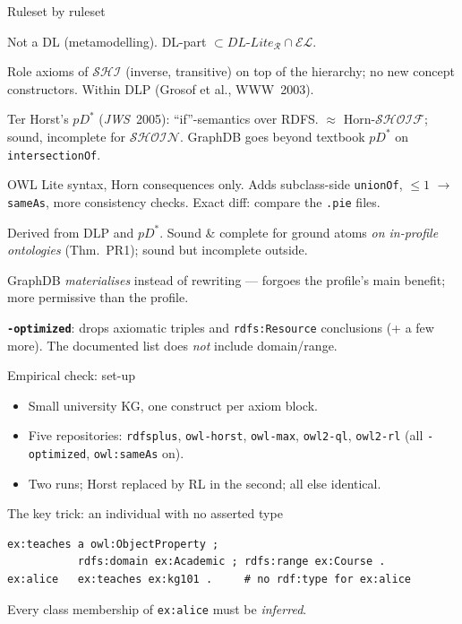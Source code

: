 \documentclass[10pt,aspectratio=169,xcolor=table]{beamer}
\newcommand{\dl}[1]{\ensuremath{\mathcal{#1}}}
\newcommand{\EL}{\dl{EL}}
\newcommand{\SHOIN}{\dl{SHOIN}}
\newcommand{\dllite}[1]{\ensuremath{\textit{DL-Lite}_{#1}}}
\begin{document}
\begin{frame}{Ruleset by ruleset}
  \small
  \begin{description}
    \item[RDFS] Not a DL (metamodelling). DL-part $\subset \dllite{\mathcal{R}} \cap \EL$.
    \item[RDFS-Plus] Role axioms of \dl{SHI} (inverse, transitive) on top of the
      hierarchy; no new concept constructors. Within DLP (Grosof et al., WWW~2003).
    \item[OWL-Horst] Ter Horst's $pD^*$ (\emph{JWS}~2005): ``if''-semantics over RDFS.
      $\approx$ Horn-\dl{SHOIF}; sound, incomplete for \SHOIN. GraphDB goes beyond textbook
      $pD^*$ on \texttt{intersectionOf}.
    \item[OWL-Max] OWL Lite syntax, Horn consequences only. Adds subclass-side
      \texttt{unionOf}, ${\leq}1$ $\to$ \texttt{sameAs}, more consistency checks.
      Exact diff: compare the \texttt{.pie} files.
    \item[OWL 2 RL] Derived from DLP and $pD^*$. Sound \& complete for ground atoms
      \emph{on in-profile ontologies} (Thm.~PR1); sound but incomplete outside.
    \item[OWL 2 QL] GraphDB \emph{materialises} instead of rewriting --- forgoes the
      profile's main benefit; more permissive than the profile.
  \end{description}
  \vspace{2pt}
  \footnotesize\textbf{\texttt{-optimized}}: drops axiomatic triples and \texttt{rdfs:Resource}
  conclusions (+ a few more). The documented list does \emph{not} include domain/range.
\end{frame}

\begin{frame}[fragile]{Empirical check: set-up}
  \begin{itemize}
    \item Small university KG, one construct per axiom block.
    \item Five repositories: \texttt{rdfsplus}, \texttt{owl-horst}, \texttt{owl-max},
      \texttt{owl2-ql}, \texttt{owl2-rl} (all \texttt{-optimized}, \texttt{owl:sameAs} on).
    \item Two runs; Horst replaced by RL in the second; all else identical.
  \end{itemize}
  \vspace{0.5em}
  \begin{block}{The key trick: an individual with no asserted type}
\begin{lstlisting}
ex:teaches a owl:ObjectProperty ;
           rdfs:domain ex:Academic ; rdfs:range ex:Course .
ex:alice   ex:teaches ex:kg101 .     # no rdf:type for ex:alice
\end{lstlisting}
    \small Every class membership of \texttt{ex:alice} must be \emph{inferred}.
  \end{block}
\end{frame}
\end{document}
